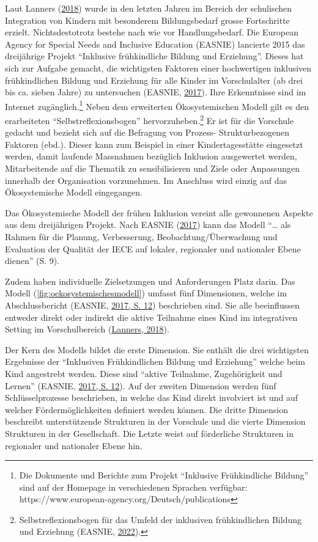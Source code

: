 \documentclass[
  ngerman,
  11pt,
  paper=a4,
  twoside,
  titlepage=true,
  openright,
  abstract=on,
  toc=listofnumbered,
  numbers=noenddot,
  chapterprefix=true,
  headings=optiontohead,
  svgnames,
  dvipsnames]{scrreprt}
\begin{document}
Laut Lanners (\protect\hyperlink{ref-lanners}{2018}) wurde in den
letzten Jahren im Bereich der schulischen Integration von Kindern mit
besonderem Bildungsbedarf grosse Fortschritte erzielt. Nichtsdestotrotz
bestehe nach wie vor Handlungsbedarf. Die European Agency for Special
Needs and Inclusive Education (EASNIE) lancierte 2015 das dreijährige
Projekt “Inklusive frühkindliche Bildung und Erziehung”. Dieses hat sich
zur Aufgabe gemacht, die wichtigsten Faktoren einer hochwertigen
inklusiven frühkindlichen Bildung und Erziehung für alle Kinder im
Vorschulalter (ab drei bis ca. sieben Jahre) zu untersuchen (EASNIE,
\protect\hyperlink{ref-europaischeagentur}{2017}). Ihre Erkenntnisse
sind im Internet zugänglich.\footnote{Die Dokumente und Berichte zum
  Projekt “Inklusive Frühkindliche Bildung” sind auf der Homepage in
  verschiedenen Sprachen verfügbar:
  https://www.european-agency.org/Deutsch/publications} Neben dem
erweiterten Ökosystemischen Modell gilt es den erarbeiteten
“Selbstreflexionsbogen” hervorzuheben.\footnote{Selbstreflexionsbogen
  für das Umfeld der inklusiven frühkindlichen Bildung und Erziehung
  (EASNIE, \protect\hyperlink{ref-web-selbstreflex}{2022}).} Er ist für
die Vorschule gedacht und bezieht sich auf die Befragung von Prozess-
Strukturbezogenen Faktoren (ebd.). Dieser kann zum Beispiel in einer
Kindertagesstätte eingesetzt werden, damit laufende Massnahmen bezüglich
Inklusion ausgewertet werden, Mitarbeitende auf die Thematik zu
sensibilisieren und Ziele oder Anpassungen innerhalb der Organisation
vorzunehmen. Im Anschluss wird einzig auf das Ökosystemische Modell
eingegangen.

Das Ökosystemische Modell der frühen Inklusion vereint alle gewonnenen
Aspekte aus dem dreijährigen Projekt. Nach EASNIE
(\protect\hyperlink{ref-europaischeagentur}{2017}) kann das Modell “…
als Rahmen für die Planung, Verbesserung, Beobachtung/Überwachung und
Evaluation der Qualität der IECE auf lokaler, regionaler und nationaler
Ebene dienen” (S. 9).

Zudem haben individuelle Zielsetzungen und Anforderungen Platz darin.
Das Modell (\cref{fig:oekosystemischesmodell}) umfasst fünf Dimensionen,
welche im Abschlussbericht (EASNIE,
\protect\hyperlink{ref-europaischeagentur}{2017, S. 12}) beschrieben
sind. Sie alle beeinflussen entweder direkt oder indirekt die aktive
Teilnahme eines Kind im integrativen Setting im Vorschulbereich
(\protect\hyperlink{ref-lanners}{Lanners, 2018}).

Der Kern des Modells bildet die erste Dimension. Sie enthält die drei
wichtigsten Ergebnisse der “Inklusiven Frühkindlichen Bildung und
Erziehung” welche beim Kind angestrebt werden. Diese sind “aktive
Teilnahme, Zugehörigkeit und Lernen” (EASNIE,
\protect\hyperlink{ref-europaischeagentur}{2017, S. 12}). Auf der
zweiten Dimension werden fünf Schlüsselprozesse beschrieben, in welche
das Kind direkt involviert ist und auf welcher Fördermöglichkeiten
definiert werden können. Die dritte Dimension beschreibt unterstützende
Strukturen in der Vorschule und die vierte Dimension Strukturen in der
Gesellschaft. Die Letzte weist auf förderliche Strukturen in regionaler
und nationaler Ebene hin.
\end{document}

